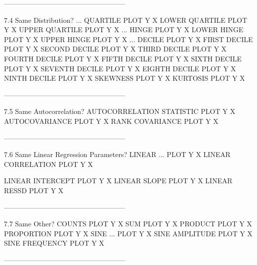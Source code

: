 -----------------------------------------------------
 
7.4
Same Distribution?
      ... QUARTILE PLOT Y X
          LOWER QUARTILE PLOT Y X
          UPPER QUARTILE PLOT Y X
      ... HINGE PLOT Y X
          LOWER HINGE PLOT Y X
          UPPER HINGE PLOT Y X
      ... DECILE PLOT Y X
          FIRST DECILE PLOT Y X
          SECOND DECILE PLOT Y X
          THIRD DECILE PLOT Y X
          FOURTH DECILE PLOT Y X
          FIFTH DECILE PLOT Y X
          SIXTH DECILE PLOT Y X
          SEVENTH DECILE PLOT Y X
          EIGHTH DECILE PLOT Y X
          NINTH DECILE PLOT Y X
      SKEWNESS PLOT Y X
      KURTOSIS PLOT Y X
 
-----------------------------------------------------
 
7.5
Same Autocorrelation?
      AUTOCORRELATION STATISTIC PLOT Y X
      AUTOCOVARIANCE PLOT Y X
      RANK COVARIANCE PLOT Y X
 
-----------------------------------------------------
 
7.6
Same Linear Regression Parameters?
      LINEAR ... PLOT Y X
         LINEAR CORRELATION PLOT Y X
 
         LINEAR INTERCEPT PLOT Y X
         LINEAR SLOPE PLOT Y X
         LINEAR RESSD PLOT Y X
 
-----------------------------------------------------
 
7.7
Same Other?
      COUNTS PLOT Y X
      SUM PLOT Y X
      PRODUCT PLOT Y X
      PROPORTION PLOT Y X
      SINE ... PLOT Y X
         SINE AMPLITUDE PLOT Y X
         SINE FREQUENCY PLOT Y X
 
-----------------------------------------------------
 
 
 
 
 
 
 
 
 
 
 
 
 
 
 
 
 
 
 
 
 
 
 
 
 
 
 
 
 
 
 
 
 
 
 
 
 
 
 
